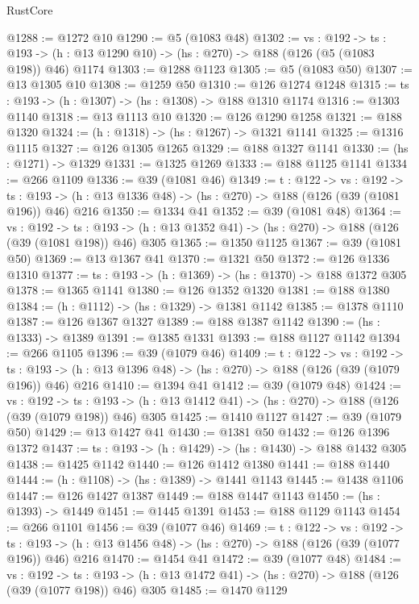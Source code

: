 \begin{lexlean}{RustCore}
\begin{coremodule}
@1288 := @1272 @10
@1290 := @5 (@1083 @48)
@1302 := {vs : @192} ->
  {ts : @193} -> (h : @13 @1290 @10) -> (hs : @270) -> @188 (@126 (@5 (@1083 @198)) @46) @1174
@1303 := @1288 @1123
@1305 := @5 (@1083 @50)
@1307 := @13 @1305 @10
@1308 := @1259 @50
@1310 := @126 @1274 @1248
@1315 := {ts : @193} -> (h : @1307) -> (hs : @1308) -> @188 @1310 @1174
@1316 := @1303 @1140
@1318 := @13 @1113 @10
@1320 := @126 @1290 @1258
@1321 := @188 @1320
@1324 := (h : @1318) -> (hs : @1267) -> @1321 @1141
@1325 := @1316 @1115
@1327 := @126 @1305 @1265
@1329 := @188 @1327 @1141
@1330 := (hs : @1271) -> @1329
@1331 := @1325 @1269
@1333 := @188 @1125 @1141
@1334 := @266 @1109
@1336 := @39 (@1081 @46)
@1349 := {t : @122} ->
  {vs : @192} ->
  {ts : @193} -> (h : @13 @1336 @48) -> (hs : @270) -> @188 (@126 (@39 (@1081 @196)) @46) @216
@1350 := @1334 @41
@1352 := @39 (@1081 @48)
@1364 := {vs : @192} ->
  {ts : @193} -> (h : @13 @1352 @41) -> (hs : @270) -> @188 (@126 (@39 (@1081 @198)) @46) @305
@1365 := @1350 @1125
@1367 := @39 (@1081 @50)
@1369 := @13 @1367 @41
@1370 := @1321 @50
@1372 := @126 @1336 @1310
@1377 := {ts : @193} -> (h : @1369) -> (hs : @1370) -> @188 @1372 @305
@1378 := @1365 @1141
@1380 := @126 @1352 @1320
@1381 := @188 @1380
@1384 := (h : @1112) -> (hs : @1329) -> @1381 @1142
@1385 := @1378 @1110
@1387 := @126 @1367 @1327
@1389 := @188 @1387 @1142
@1390 := (hs : @1333) -> @1389
@1391 := @1385 @1331
@1393 := @188 @1127 @1142
@1394 := @266 @1105
@1396 := @39 (@1079 @46)
@1409 := {t : @122} ->
  {vs : @192} ->
  {ts : @193} -> (h : @13 @1396 @48) -> (hs : @270) -> @188 (@126 (@39 (@1079 @196)) @46) @216
@1410 := @1394 @41
@1412 := @39 (@1079 @48)
@1424 := {vs : @192} ->
  {ts : @193} -> (h : @13 @1412 @41) -> (hs : @270) -> @188 (@126 (@39 (@1079 @198)) @46) @305
@1425 := @1410 @1127
@1427 := @39 (@1079 @50)
@1429 := @13 @1427 @41
@1430 := @1381 @50
@1432 := @126 @1396 @1372
@1437 := {ts : @193} -> (h : @1429) -> (hs : @1430) -> @188 @1432 @305
@1438 := @1425 @1142
@1440 := @126 @1412 @1380
@1441 := @188 @1440
@1444 := (h : @1108) -> (hs : @1389) -> @1441 @1143
@1445 := @1438 @1106
@1447 := @126 @1427 @1387
@1449 := @188 @1447 @1143
@1450 := (hs : @1393) -> @1449
@1451 := @1445 @1391
@1453 := @188 @1129 @1143
@1454 := @266 @1101
@1456 := @39 (@1077 @46)
@1469 := {t : @122} ->
  {vs : @192} ->
  {ts : @193} -> (h : @13 @1456 @48) -> (hs : @270) -> @188 (@126 (@39 (@1077 @196)) @46) @216
@1470 := @1454 @41
@1472 := @39 (@1077 @48)
@1484 := {vs : @192} ->
  {ts : @193} -> (h : @13 @1472 @41) -> (hs : @270) -> @188 (@126 (@39 (@1077 @198)) @46) @305
@1485 := @1470 @1129

\end{coremodule}
\end{lexlean}
